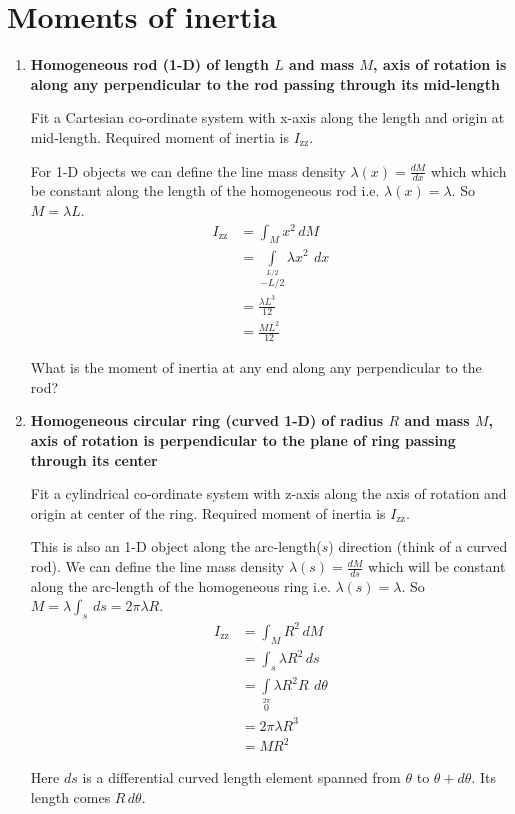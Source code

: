 \documentclass[a4paper,10pt]{article}
\begin{document}
\section*{Moments of inertia}
\begin{enumerate}
\item \textbf{Homogeneous rod (1-D) of length $L$ and mass $M$, axis of rotation is along any perpendicular to the rod passing through its mid-length}

Fit a Cartesian co-ordinate system with x-axis along the length and origin at mid-length.  Required moment of inertia is $I_{\text{zz}}$.

For 1-D objects we can define the line mass density $\lambda(x) = \frac{dM}{dx}$ which which be constant along the length of the homogeneous rod i.e. $\lambda(x) = \lambda$. So $M = \lambda L$.
\begin{align*}
I_\text{zz} &= \int_M x^2 \,dM\\
&= \int\limits_{-L/2}\limits^{L/2} \lambda x^2\ \,dx\\
&= \frac{\lambda L^3}{12}\\
&= \frac{ML^2}{12}
\end{align*}

What is the moment of inertia at any end along any perpendicular to the rod?

\item \textbf{Homogeneous circular ring (curved 1-D) of radius $R$ and mass $M$, axis of rotation is perpendicular to the plane of ring passing through its center}

Fit a cylindrical co-ordinate system with z-axis along the axis of rotation and origin at center of the ring. Required moment of inertia is $I_{\text{zz}}$.

This is also an 1-D object along the arc-length($s$) direction (think of a curved rod). We can define the line mass density $\lambda(s) = \frac{dM}{ds}$ which will be constant along the arc-length of the homogeneous ring i.e. $\lambda(s) = \lambda$. So $M = \lambda\int_s \,ds = 2\pi\lambda R$.
\begin{align*}
I_\text{zz} &= \int_M R^2 \,dM\\
&= \int_s \lambda R^2 \,ds\\
&= \int\limits_{0}\limits^{2\pi} \lambda R^2 R\ \,d\theta\\
&= 2\pi\lambda R^3\\
&= MR^2
\end{align*}

Here $ds$ is a differential curved length element spanned from $\theta$ to $\theta+d\theta$. Its length comes $R\,d\theta$.


\end{enumerate}
\end{document}
